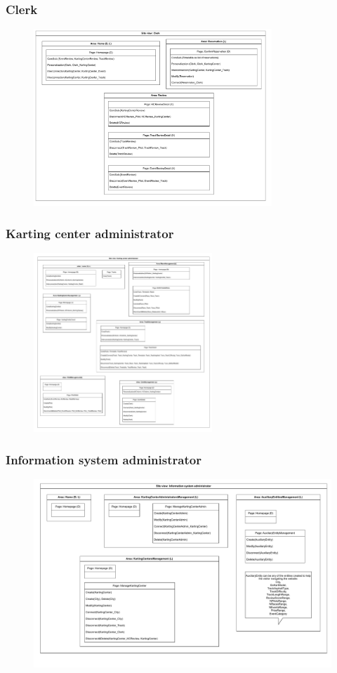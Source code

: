 \documentclass{beamer}
\begin{document}
\begin{frame}
    \frametitle{Clerk}
    \begin{figure}
        \centering
        \includegraphics[width=0.8\textwidth]{drawio/clerk-view.pdf}
    \end{figure}
\end{frame}

\begin{frame}
    \frametitle{Karting center administrator}
    \begin{figure}
        \centering
        \includegraphics[width=0.6\textwidth]{drawio/karting-center-admin-view.pdf}
    \end{figure}
\end{frame}

\begin{frame}
    \frametitle{Information system administrator}
    \begin{figure}
        \centering
        \includegraphics[width=1\textwidth]{drawio/is-admin-view.pdf}
    \end{figure}
\end{frame}
\end{document}
